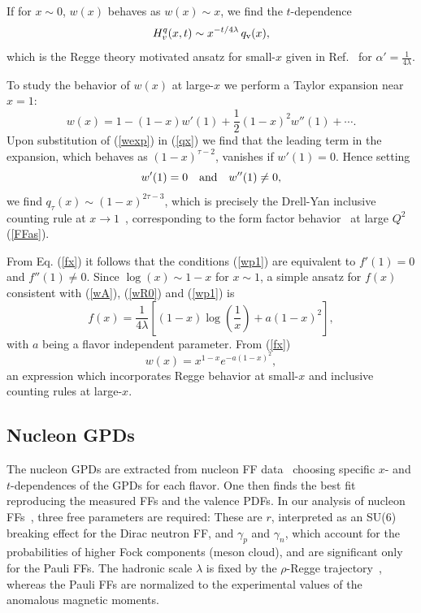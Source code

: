\documentclass[aps,prl,reprint,groupedaddress, preprintnumbers]{revtex4-1}
\def\be{\begin{equation}}
\def\ee{\end{equation}}
\newcommand{\half}{{\frac{1}{2}}}
\newcommand{\req}[1]{(\ref{#1})}
\begin{document}
If for $x\sim0$, $w(x)$ behaves as $w(x) \sim x$, we find the $t$-dependence 
\be \label{wR0} 
   H^q_v(x,t) \sim x^{- t/ 4 \lambda } \, q_{\rm v}(x),
\ee
which is the Regge theory motivated ansatz for small-$x$ given in Ref.~\cite{Goeke:2001tz}  for $\alpha' =  \frac{1}{4 \lambda}.$


To study the behavior of $w(x)$ at large-$x$ we perform a Taylor expansion near $x =1$:
\be \label{wexp}
w(x) = 1 - (1-x) w'(1) + \half (1 - x)^2 w''(1) + \cdots .
\ee
Upon substitution of \req{wexp} in \req{qx} we find that the leading term in the expansion, which behaves as $(1-x)^{\tau-2}$, vanishes if $w'(1) = 0$. Hence setting 
\be \label{wp1}
w'(1) = 0 \quad {\rm and} \quad w''(1) \ne 0,
\ee
we find $q_\tau(x)  \sim (1-x)^{2 \tau - 3}$, which is precisely the  Drell-Yan inclusive counting rule at $x \to 1$~\cite{Drell:1969km, Blankenbecler:1974tm, Brodsky:1979qm}, corresponding to the form factor behavior~\label{FFasy} at large $Q^2$ \req{FFas}.

From Eq. \req{fx} it follows that the conditions \req{wp1} are equivalent to $f'(1) = 0$ and $f''(1) \ne 0$.
Since $\log(x) \sim 1-x$ for $x \sim 1$,  a simple ansatz for $f(x)$ consistent with  \req{wA}, \req{wR0} and \req{wp1} is
\be \label{fax} 
f(x) =   \frac{1}{4 \lambda}\left[  (1-x) \log\left(\frac{1}{x}\right) + a (1 - x)^2 \right],
\ee 
with $a$ being a flavor independent parameter. From \req{fx}
\be \label{wax}
w(x) = x^{1-x} e^{-a (1-x)^2},
\ee
an expression which incorporates Regge behavior at small-$x$  and inclusive counting rules  at large-$x$.  


\subsection{Nucleon GPDs}

The nucleon GPDs are extracted from nucleon FF data~\cite{Diehl:2004cx, Guidal:2004nd, Selyugin:2009ic, Diehl:2013xca, GonzalezHernandez:2012jv} choosing specific $x$- and $t$-dependences of the GPDs for each flavor. One then finds the best fit reproducing the measured FFs and the valence PDFs. In our analysis of nucleon FFs~\cite{Sufian:2016hwn}, three free parameters are required: These are $r$, interpreted as an SU(6) breaking effect for the Dirac neutron FF, and $\gamma_p$ and $\gamma_n$, which account for the probabilities of higher Fock components (meson cloud), and are significant only for the Pauli FFs. The hadronic scale $\lambda$ is fixed by the $\rho$-Regge trajectory~\cite{Brodsky:2014yha}, whereas the Pauli FFs are normalized to the experimental values of the anomalous magnetic moments.
\end{document}
